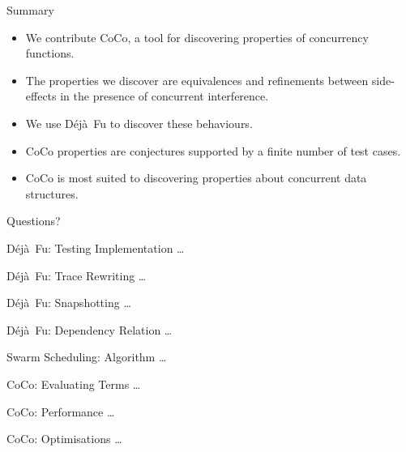 \documentclass{beamer}
\newcommand{\dejafu}{D\'{e}j\`{a}~Fu}
\begin{document}
\begin{frame}{Summary}

  \begin{itemize}
  \item We contribute CoCo, a tool for discovering properties of
    concurrency functions.

  \item The properties we discover are equivalences and refinements
    between side-effects in the presence of concurrent interference.

  \item We use \dejafu{} to discover these behaviours.

  \item CoCo properties are conjectures supported by a finite number
    of test cases.

  \item CoCo is most suited to discovering properties about concurrent
    data structures.
\end{itemize}
\end{frame}

\begin{frame}[standout]
  Questions?
\end{frame}

\appendix

\begin{frame}{\dejafu{}: Testing Implementation}
  \ldots %
\end{frame}

\begin{frame}{\dejafu{}: Trace Rewriting}
  \ldots %
\end{frame}

\begin{frame}{\dejafu{}: Snapshotting}
  \ldots %
\end{frame}

\begin{frame}{\dejafu{}: Dependency Relation}
  \ldots %
\end{frame}

\begin{frame}{Swarm Scheduling: Algorithm}
  \ldots %
\end{frame}

\begin{frame}{CoCo: Evaluating Terms}
  \ldots %
\end{frame}

\begin{frame}{CoCo: Performance}
  \ldots %
\end{frame}

\begin{frame}{CoCo: Optimisations}
  \ldots %
\end{frame}
\end{document}
